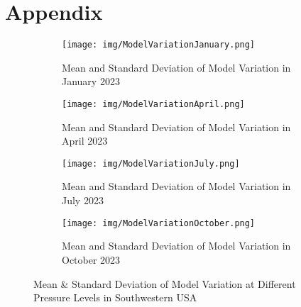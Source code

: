\onecolumn
\section*{Appendix}

\begin{figure*}[!ht] %
    \centering
    \begin{subfigure}[h]{\textwidth}
        \centering
        \texttt{[image: img/ModelVariationJanuary.png]}
        \caption{Mean and Standard Deviation of Model Variation in January 2023}
        \label{fig:ModelVariationJanuary}
    \end{subfigure}
    
    \vspace{4mm} %

    \begin{subfigure}[h]{\textwidth}
        \centering
        \texttt{[image: img/ModelVariationApril.png]}
        \caption{Mean and Standard Deviation of Model Variation in April 2023}
        \label{fig:ModelVariationApril}
    \end{subfigure}
    
    \vspace{4mm} %

    \begin{subfigure}[h]{\textwidth}
        \centering
        \texttt{[image: img/ModelVariationJuly.png]}
        \caption{Mean and Standard Deviation of Model Variation in July 2023}
        \label{fig:ModelVariationJuly}
    \end{subfigure}
    
    \vspace{4mm} %

    \begin{subfigure}[h]{\textwidth}
        \centering
        \texttt{[image: img/ModelVariationOctober.png]}
        \caption{Mean and Standard Deviation of Model Variation in October 2023}
        \label{fig:ModelVariationOctober}
    \end{subfigure}

    \caption{Mean \& Standard Deviation of Model Variation at Different Pressure Levels in Southwestern USA}
    \label{fig:ModelVariations}
\end{figure*}
